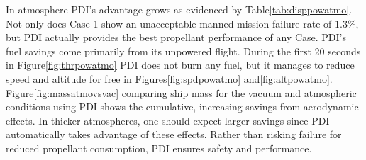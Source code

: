 In atmosphere PDI's advantage grows as evidenced by Table\:\ref{tab:disppowatmo}. Not only does Case 1 show an unacceptable manned mission failure rate of $1.3\%$, but PDI actually provides the best propellant performance of any Case. PDI's fuel savings come primarily from its unpowered flight. During the first 20 seconds in Figure\:\ref{fig:thrpowatmo} PDI does not burn any fuel, but it manages to reduce speed and altitude for free in Figures\:\ref{fig:spdpowatmo} and\:\ref{fig:altpowatmo}. Figure\:\ref{fig:massatmovsvac} comparing ship mass for the vacuum and atmospheric conditions using PDI shows the cumulative, increasing savings from aerodynamic effects.  In thicker atmospheres, one should expect larger savings since PDI automatically takes advantage of these effects. Rather than risking failure for reduced propellant consumption, PDI ensures safety and performance.



%
%
%
%
%
%
%
%
%
%
%

